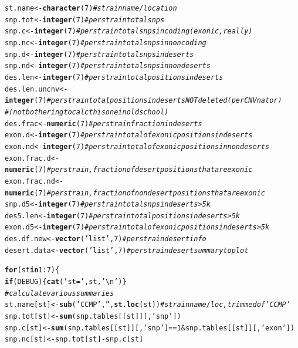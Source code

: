 \documentclass{article}\usepackage[]{graphicx}\usepackage[]{color}
\makeatletter
\newcommand{\hlnum}[1]{\textcolor[rgb]{0.686,0.059,0.569}{#1}}%
\newcommand{\hlstr}[1]{\textcolor[rgb]{0.192,0.494,0.8}{#1}}%
\newcommand{\hlcom}[1]{\textcolor[rgb]{0.678,0.584,0.686}{\textit{#1}}}%
\newcommand{\hlopt}[1]{\textcolor[rgb]{0,0,0}{#1}}%
\newcommand{\hlstd}[1]{\textcolor[rgb]{0.345,0.345,0.345}{#1}}%
\newcommand{\hlkwa}[1]{\textcolor[rgb]{0.161,0.373,0.58}{\textbf{#1}}}%
\newcommand{\hlkwb}[1]{\textcolor[rgb]{0.69,0.353,0.396}{#1}}%
\newcommand{\hlkwd}[1]{\textcolor[rgb]{0.737,0.353,0.396}{\textbf{#1}}}%
\newenvironment{kframe}{%
 \def\at@end@of@kframe{}%
 \ifinner\ifhmode%
  \def\at@end@of@kframe{\end{minipage}}%
  \begin{minipage}{\columnwidth}%
 \fi\fi%
 \def\FrameCommand##1{\hskip\@totalleftmargin \hskip-\fboxsep
 \colorbox{shadecolor}{##1}\hskip-\fboxsep
     \hskip-\linewidth \hskip-\@totalleftmargin \hskip\columnwidth}%
 \MakeFramed {\advance\hsize-\width
   \@totalleftmargin\z@ \linewidth\hsize
   \@setminipage}}%
 {\par\unskip\endMakeFramed%
 \at@end@of@kframe}
\newenvironment{knitrout}{}{} %
\makeatother
\begin{document}
\begin{knitrout}
\begin{kframe}
\begin{alltt}
  \hlstd{st.name}      \hlkwb{<-} \hlkwd{character}\hlstd{(}\hlnum{7}\hlstd{)} \hlcom{# strain name/location}
  \hlstd{snp.tot}      \hlkwb{<-} \hlkwd{integer}\hlstd{(}\hlnum{7}\hlstd{)}   \hlcom{# per strain total snps}
  \hlstd{snp.c}        \hlkwb{<-} \hlkwd{integer}\hlstd{(}\hlnum{7}\hlstd{)}   \hlcom{# per strain total snps in coding (exonic, really)}
  \hlstd{snp.nc}       \hlkwb{<-} \hlkwd{integer}\hlstd{(}\hlnum{7}\hlstd{)}   \hlcom{# per strain total snps in noncoding}
  \hlstd{snp.d}        \hlkwb{<-} \hlkwd{integer}\hlstd{(}\hlnum{7}\hlstd{)}   \hlcom{# per strain total snps in deserts }
  \hlstd{snp.nd}       \hlkwb{<-} \hlkwd{integer}\hlstd{(}\hlnum{7}\hlstd{)}   \hlcom{# per strain total snps in nondeserts }
  \hlstd{des.len}      \hlkwb{<-} \hlkwd{integer}\hlstd{(}\hlnum{7}\hlstd{)}   \hlcom{# per strain total positions in deserts}
  \hlstd{des.len.uncnv}\hlkwb{<-} \hlkwd{integer}\hlstd{(}\hlnum{7}\hlstd{)}   \hlcom{# per strain total positions in deserts NOT deleted (per CNVnator)}
                               \hlcom{# (not bothering to calc this one in oldschool)}
  \hlstd{des.frac}     \hlkwb{<-} \hlkwd{numeric}\hlstd{(}\hlnum{7}\hlstd{)}   \hlcom{# per strain fraction in deserts}
  \hlstd{exon.d}       \hlkwb{<-} \hlkwd{integer}\hlstd{(}\hlnum{7}\hlstd{)}   \hlcom{# per strain total of exonic positions in deserts}
  \hlstd{exon.nd}      \hlkwb{<-} \hlkwd{integer}\hlstd{(}\hlnum{7}\hlstd{)}   \hlcom{# per strain total of exonic positions in nondeserts}
  \hlstd{exon.frac.d}  \hlkwb{<-} \hlkwd{numeric}\hlstd{(}\hlnum{7}\hlstd{)}   \hlcom{# per strain, fraction of desert positions that are exonic}
  \hlstd{exon.frac.nd} \hlkwb{<-} \hlkwd{numeric}\hlstd{(}\hlnum{7}\hlstd{)}   \hlcom{# per strain, fraction of nondesert positions that are exonic}
  \hlstd{snp.d5}       \hlkwb{<-} \hlkwd{integer}\hlstd{(}\hlnum{7}\hlstd{)}   \hlcom{# per strain total snps in deserts >5k}
  \hlstd{des5.len}     \hlkwb{<-} \hlkwd{integer}\hlstd{(}\hlnum{7}\hlstd{)}   \hlcom{# per strain total positions in deserts >5k}
  \hlstd{exon.d5}      \hlkwb{<-} \hlkwd{integer}\hlstd{(}\hlnum{7}\hlstd{)}   \hlcom{# per strain total of exonic positions in deserts >5k}
  \hlstd{des.df.new}   \hlkwb{<-} \hlkwd{vector}\hlstd{(}\hlstr{'list'}\hlstd{,}\hlnum{7}\hlstd{)} \hlcom{# per strain desert info}
  \hlstd{desert.data}  \hlkwb{<-} \hlkwd{vector}\hlstd{(}\hlstr{'list'}\hlstd{,}\hlnum{7}\hlstd{)} \hlcom{# per strain desert summary to plot}

  \hlkwa{for}\hlstd{(st} \hlkwa{in} \hlnum{1}\hlopt{:}\hlnum{7}\hlstd{)\{}
    \hlkwa{if}\hlstd{(DEBUG)\{}\hlkwd{cat}\hlstd{(}\hlstr{'st='}\hlstd{,st,}\hlstr{'\textbackslash{}n'}\hlstd{)\}}
    \hlcom{# calculate various summaries}
    \hlstd{st.name[st]} \hlkwb{<-} \hlkwd{sub}\hlstd{(}\hlstr{'CCMP'}\hlstd{,} \hlstr{''}\hlstd{,} \hlkwd{st.loc}\hlstd{(st))} \hlcom{# strain name/loc, trimmed of 'CCMP'}
    \hlstd{snp.tot[st]} \hlkwb{<-} \hlkwd{sum}\hlstd{(snp.tables[[st]][,}\hlstr{'snp'}\hlstd{])}
    \hlstd{snp.c[st]}   \hlkwb{<-} \hlkwd{sum}\hlstd{(snp.tables[[st]][,}\hlstr{'snp'}\hlstd{]}\hlopt{==}\hlnum{1} \hlopt{&} \hlstd{snp.tables[[st]][,}\hlstr{'exon'}\hlstd{])}
    \hlstd{snp.nc[st]}  \hlkwb{<-} \hlstd{snp.tot[st]} \hlopt{-} \hlstd{snp.c[st]}


\end{alltt}
\end{kframe}
\end{knitrout}
\end{document}
